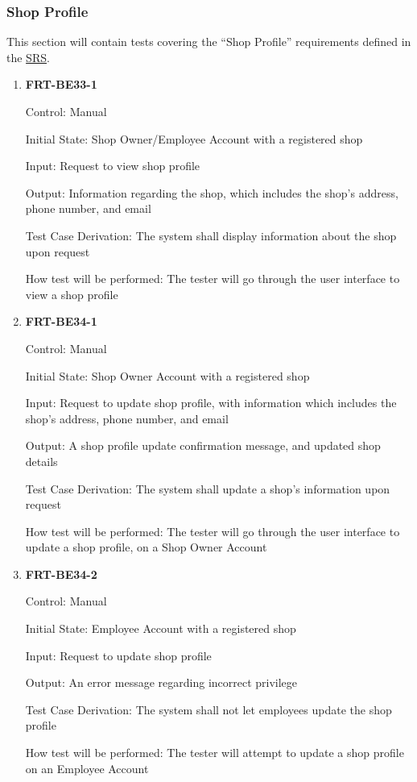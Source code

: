 \documentclass[12pt, titlepage]{article}
\begin{document}
\subsubsection{Shop Profile}

This section will contain tests covering the ``Shop Profile'' requirements defined in the
\href{https://github.com/arkinmodi/project-sayyara/blob/main/docs/SRS/SRS.pdf}{SRS}.

\begin{enumerate}
	\item \textbf{FRT-BE33-1}

	      Control: Manual

	      Initial State: Shop Owner/Employee Account with a registered shop

	      Input: Request to view shop profile

	      Output: Information regarding the shop, which includes the shop's address, phone number, and email

	      Test Case Derivation: The system shall display information about the shop upon request

	      How test will be performed: The tester will go through the user interface to view a shop profile

	\item \textbf{FRT-BE34-1}

	      Control: Manual

	      Initial State: Shop Owner Account with a registered shop

	      Input: Request to update shop profile, with information which includes the shop's address, phone
	      number, and email

	      Output: A shop profile update confirmation message, and updated shop details

	      Test Case Derivation: The system shall update a shop's information upon request

	      How test will be performed: The tester will go through the user interface to update a shop profile,
	      on a Shop Owner Account

	\item \textbf{FRT-BE34-2}

	      Control: Manual

	      Initial State: Employee Account with a registered shop

	      Input: Request to update shop profile

	      Output: An error message regarding incorrect privilege

	      Test Case Derivation: The system shall not let employees update the shop profile

	      How test will be performed: The tester will attempt to update a shop profile on an Employee Account
\end{enumerate}
\end{document}
